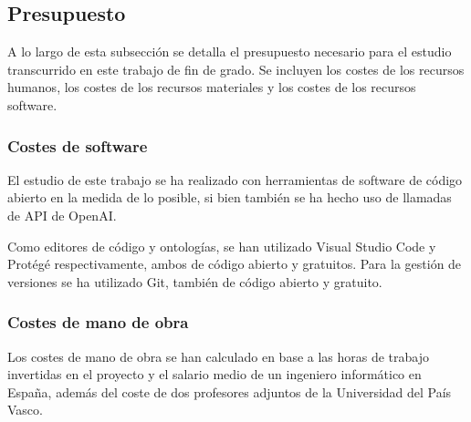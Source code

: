 \subsection{Presupuesto}
A lo largo de esta subsección se detalla el presupuesto necesario para el estudio transcurrido en este trabajo de fin de grado. Se incluyen los costes de los recursos humanos, los costes de los recursos materiales y los costes de los recursos software.

\subsubsection{Costes de software}
El estudio de este trabajo se ha realizado con herramientas de software de código abierto en la medida de lo posible, si bien también se ha hecho uso de llamadas de API de OpenAI.

Como editores de código y ontologías, se han utilizado Visual Studio Code y Protégé respectivamente, ambos de código abierto y gratuitos. Para la gestión de versiones se ha utilizado Git, también de código abierto y gratuito.


\subsubsection{Costes de mano de obra}
Los costes de mano de obra se han calculado en base a las horas de trabajo invertidas en el proyecto y el salario medio de un ingeniero informático en España, además del coste de dos profesores adjuntos de la Universidad del País Vasco.